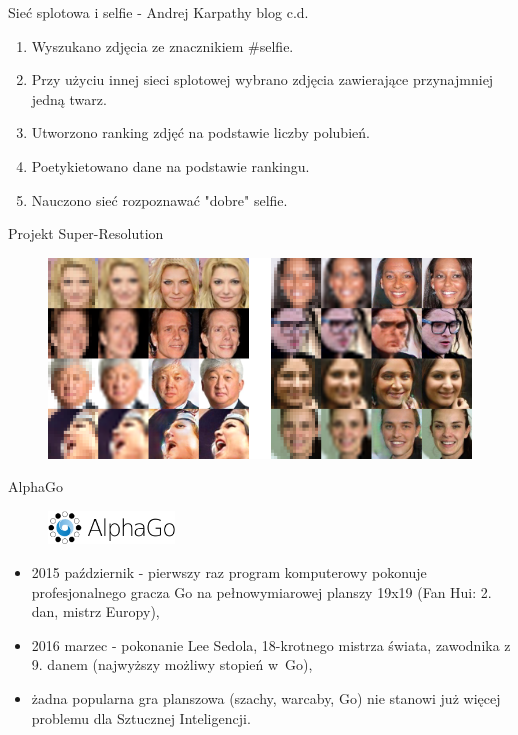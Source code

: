 \documentclass[xcolor=dvipsnames]{beamer}
\begin{document}
\begin{frame}{Sieć splotowa i selfie - Andrej Karpathy blog c.d.}
	\begin{enumerate}
		\item Wyszukano zdjęcia ze znacznikiem \#selfie.
		\item Przy użyciu innej sieci splotowej wybrano zdjęcia zawierające przynajmniej jedną twarz.
		\item Utworzono ranking zdjęć na podstawie liczby polubień.
		\item Poetykietowano dane na podstawie rankingu.
		\item Nauczono sieć rozpoznawać "dobre" selfie.
	\end{enumerate}
\end{frame}
\begin{frame}{Projekt Super-Resolution}
	\begin{figure}
		\includegraphics[width=\textwidth]{img/super-resolution.png}
	\end{figure}
\end{frame}
\begin{frame}{AlphaGo}
	\begin{figure}
		\includegraphics[width=0.3\textwidth]{img/alpha_go.png}
	\end{figure}
	\begin{itemize}
		\item 2015 październik - pierwszy raz program komputerowy pokonuje profesjonalnego gracza Go na pełnowymiarowej planszy 19x19 (Fan Hui: 2. dan, mistrz Europy),
		\item 2016 marzec - pokonanie Lee Sedola, 18-krotnego mistrza świata, zawodnika z 9. danem (najwyższy możliwy stopień w~Go),
		\item żadna popularna gra planszowa (szachy, warcaby, Go) nie stanowi już więcej problemu dla Sztucznej Inteligencji.
	\end{itemize}
\end{frame}
\end{document}
